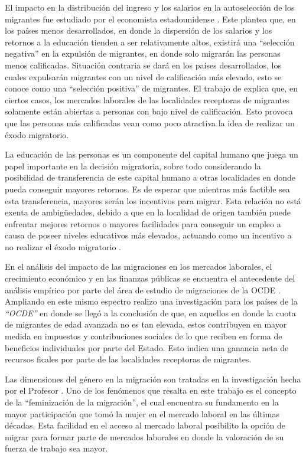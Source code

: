 \documentclass[12pt,a4paper]{article}
\begin{document}
El impacto en la distribución del ingreso y los salarios en la autoselección de los migrantes fue estudiado por el economista estadounidense \textcite{borjas_self-selection_1987}. Este plantea que, en los países menos desarrollados, en donde la dispersión de los salarios y los retornos a la educación tienden a ser relativamente altos, existirá una ``selección negativa'' en la expulsión de migrantes, en donde solo migrarán las personas menos calificadas. Situación contraria se dará en los países desarrollados, los cuales expulsarán migrantes con un nivel de calificación más elevado, esto se conoce como una ``selección positiva'' de migrantes. El trabajo de \textcite{stark_migration_1991} explica que, en ciertos casos, los mercados laborales de las localidades receptoras de migrantes solamente están abiertas a personas con bajo nivel de calificación. Esto provoca que las personas más calificadas vean como poco atractiva la idea de realizar un éxodo migratorio.

La educación de las personas es un componente del capital humano que juega un  papel importante en la decisión migratoria, sobre todo considerando la posibilidad de transferencia de este capital humano a otras localidades en donde pueda conseguir mayores retornos. Es de esperar que mientras más factible sea esta transferencia, mayores serán los incentivos para migrar. Esta relación no está exenta de ambigüedades, debido a que en la localidad de origen también puede enfrentar mejores retornos o mayores facilidades para conseguir un empleo a causa de poseer niveles educativos más elevados, actuando como un incentivo a no realizar el éxodo migratorio \parencite{danzer_economic_2008}.

En el análisis del impacto de las migraciones en los mercados laborales, el crecimiento económico y en las finanzas públicas se encuentra el antecedente del análisis empírico por parte del área de estudio de migraciones de la OCDE \textcite{dumont_is_2014}. Ampliando en este mismo espectro \textcite{liebig_fiscal_2013} realizo una investigación para los países de la \textit{``OCDE''} en donde se llegó a la conclusión de que, en aquellos en donde la cuota de migrantes de edad avanzada no es tan elevada, estos contribuyen en mayor medida en impuestos y contribuciones sociales de lo que reciben en forma de beneficios individuales por parte del Estado. Esto indica una ganancia neta de recursos ficales por parte de las localidades receptoras de migrantes.

Las dimensiones del género en la migración son tratadas en la investigación hecha por el Profesor \textcite{carling_gender_2005}. Uno de los fenómenos que resalta en este trabajo es el concepto de la ``feminización de la migración'', el cual encuentra su fundamento en la mayor participación que tomó la mujer en el mercado laboral en las últimas décadas. Esta facilidad en el acceso al mercado laboral posibilito la opción de migrar para formar parte de mercados laborales en donde la valoración de su fuerza de trabajo sea mayor. 
\end{document}
